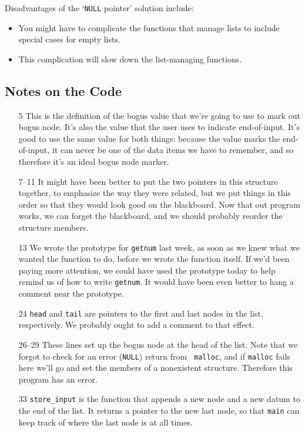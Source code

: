 Disadvantages of the `{\tt NULL} pointer' solution include:

\begin{itemize}
\item You might have to complicate the functions that manage lists to
include special cases for empty lists.
\item This complication will slow down the list-managing functions.
\end{itemize}

\subsection{Notes on the Code}

\begin{itemize}
\item[5] This is the definition of the bogus value that we're going to
use to mark out bogus node.  It's also the value that the user uses to
indicate end-of-input.  It's good to use the same value for both things:
because the value marks the end-of-input, it can never be one of the
data items we have to remember, and so therefore it's an ideal bogus
node marker.
\item[7--11] It might have been better to put the two pointers in this
structure together, to emphasize the way they were related, but we put
things in this order so that they would look good on the blackboard.
Now that out program works, we can forget the blackboard, and we should
probably reorder the structure members.
\item[13] We wrote the prototype for {\tt getnum} last week, as soon as
we knew what we wanted the function to do, before we wrote the function
itself.  If we'd been paying more attention, we could have used the
prototype today to help remind us of how to write {\tt getnum}. It would
have been even better to hang a comment near the prototype. 
\item[24] {\tt head} and {\tt tail} are pointers to the first and last
nodes in the list, respectively.  We probably ought to add a comment to
that effect.
\item[26--29] These lines set up the bogus node at the head of the list.
Note that we forgot to check for an error ({\tt NULL}) return from {\tt
malloc}, and if {\tt malloc} fails here we'll go and set the members of
a nonexistent structure.  Therefore this program has an error.
\item[33] {\tt store\_input} is the function that appends a new node and
a new datum to the end of the list.  It returns a pointer to the new
last node, so that {\tt main} can keep track of where the last node is
at all times.  


\end{itemize}
